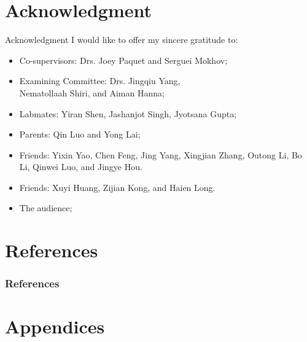 \documentclass{beamer}
\begin{document}
\section*{Acknowledgment}
\begin{frame}{Acknowledgment}
    I would like to offer my sincere gratitude to:
    \begin{itemize}
        \item Co-supervisors: Drs. Joey Paquet and Serguei Mokhov;
        \item Examining Committee: Drs. Jingqiu Yang, \\Nematollaah Shiri, 
              and Aiman Hanna;
        \item Labmates: Yiran Shen, Jashanjot Singh, Jyotsana Gupta;
        \item Parents: Qin Luo and Yong Lai;
        \item Friends: Yixin Yao, Chen Feng, Jing Yang, Xingjian Zhang, 
              Outong Li, Bo Li, Qinwei Luo, and Jingye Hou.
        \item Friends: Xuyi Huang, Zijian Kong, and Haien Long.
        \item The audience;
    \end{itemize}
\end{frame}

\section*{References}
\begin{frame}[allowframebreaks]
	\frametitle{References}
	
	
\end{frame}

\appendix
\section*{Appendices}

\end{document}
